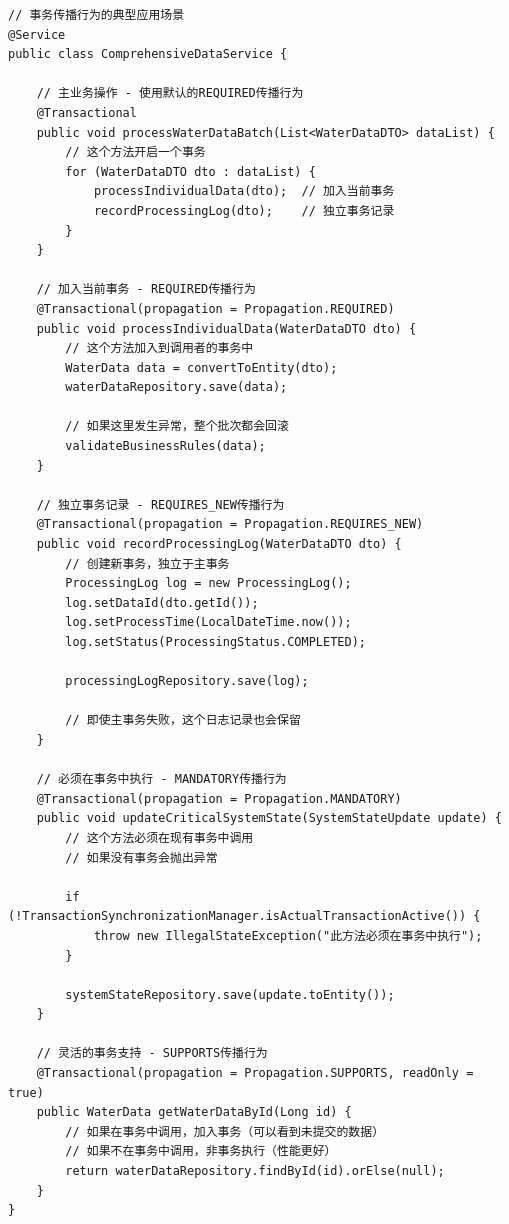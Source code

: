 \begin{lstlisting}[style=java]
// 事务传播行为的典型应用场景
@Service
public class ComprehensiveDataService {
    
    // 主业务操作 - 使用默认的REQUIRED传播行为
    @Transactional
    public void processWaterDataBatch(List<WaterDataDTO> dataList) {
        // 这个方法开启一个事务
        for (WaterDataDTO dto : dataList) {
            processIndividualData(dto);  // 加入当前事务
            recordProcessingLog(dto);    // 独立事务记录
        }
    }
    
    // 加入当前事务 - REQUIRED传播行为
    @Transactional(propagation = Propagation.REQUIRED)
    public void processIndividualData(WaterDataDTO dto) {
        // 这个方法加入到调用者的事务中
        WaterData data = convertToEntity(dto);
        waterDataRepository.save(data);
        
        // 如果这里发生异常，整个批次都会回滚
        validateBusinessRules(data);
    }
    
    // 独立事务记录 - REQUIRES_NEW传播行为
    @Transactional(propagation = Propagation.REQUIRES_NEW)
    public void recordProcessingLog(WaterDataDTO dto) {
        // 创建新事务，独立于主事务
        ProcessingLog log = new ProcessingLog();
        log.setDataId(dto.getId());
        log.setProcessTime(LocalDateTime.now());
        log.setStatus(ProcessingStatus.COMPLETED);
        
        processingLogRepository.save(log);
        
        // 即使主事务失败，这个日志记录也会保留
    }
    
    // 必须在事务中执行 - MANDATORY传播行为
    @Transactional(propagation = Propagation.MANDATORY)
    public void updateCriticalSystemState(SystemStateUpdate update) {
        // 这个方法必须在现有事务中调用
        // 如果没有事务会抛出异常
        
        if (!TransactionSynchronizationManager.isActualTransactionActive()) {
            throw new IllegalStateException("此方法必须在事务中执行");
        }
        
        systemStateRepository.save(update.toEntity());
    }
    
    // 灵活的事务支持 - SUPPORTS传播行为
    @Transactional(propagation = Propagation.SUPPORTS, readOnly = true)
    public WaterData getWaterDataById(Long id) {
        // 如果在事务中调用，加入事务（可以看到未提交的数据）
        // 如果不在事务中调用，非事务执行（性能更好）
        return waterDataRepository.findById(id).orElse(null);
    }
}
\end{lstlisting}

